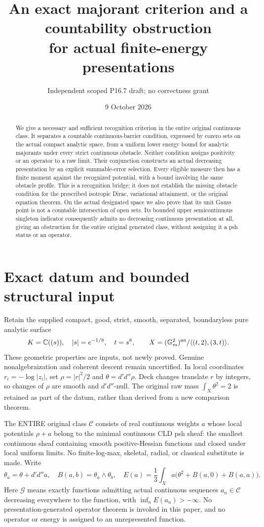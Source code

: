 \documentclass[11pt]{article}
\title{An exact majorant criterion and a countability obstruction\\
for actual finite-energy presentations}
\author{Independent scoped P16.7 draft; no correctness grant}
\date{9 October 2026}
\newcommand{\DD}{d'd''}
\newcommand{\C}{\mathcal C}
\newcommand{\G}{\mathcal G}
\begin{document}
\maketitle
\begin{abstract}
We give a necessary and sufficient recognition criterion in the entire
original continuous class. It separates a countable continuous-barrier
condition, expressed by cozero sets on the actual compact analytic space,
from a uniform lower energy bound for analytic majorants under every
strict continuous obstacle. Neither condition assigns positivity or an
operator to a raw limit. Their conjunction constructs an actual decreasing
presentation by an explicit summable-error selection. Every eligible
measure then has a finite moment against the recognized potential, with a
bound involving the same obstacle profile. This is a recognition bridge;
it does not establish the missing obstacle condition for the prescribed
isotropic Dirac, variational attainment, or the original equation theorem.
On the actual designated space we also prove that its unit Gauss point
is not a countable intersection of open sets. Its bounded upper
semicontinuous singleton indicator consequently admits no decreasing
continuous presentation at all, giving an obstruction for the entire
original generated class, without assigning it a psh status or an operator.
\end{abstract}

\section*{Exact datum and bounded structural input}
Retain the supplied compact, good, strict, smooth, separated, boundaryless
pure analytic surface
\[
 K=\mathbb C((s)),\quad |s|=e^{-1/8},\quad t=s^8,\qquad
 X=(\mathbb G_m^2)^{\rm an}/\langle(t,2),(3,t)\rangle.
\]
These geometric properties are inputs, not newly proved. Genuine
nonalgebraization and coherent descent remain uncertified. In local
coordinates $r_i=-\log|z_i|$, set $\rho=|r|^2/2$ and $\theta=\DD\rho$.
Deck changes translate $r$ by integers, so changes of $\rho$ are smooth
and $\DD$-null. The original raw mass $\int_X\theta^2=2$ is retained
as part of the datum, rather than derived from a new comparison theorem.

The ENTIRE original class $\C$ consists of real continuous weights $a$
whose local potentials $\rho+a$ belong to the minimal continuous CLD psh
sheaf: the smallest continuous sheaf containing smooth positive-Hessian
functions and closed under local uniform limits. No finite-log-max,
skeletal, radial, or classical substitute is made. Write
\[
 \theta_a=\theta+\DD a,\quad B(a,b)=\theta_a\wedge\theta_b,\quad
 E(a)=\frac13\int_X a\bigl(\theta^2+B(a,0)+B(a,a)\bigr).
\]
Here $\G$ means exactly functions admitting actual continuous sequences
$a_n\in\C$ decreasing everywhere to the function, with
$\inf_n E(a_n)>-\infty$. No presentation-generated operator theorem is
invoked in this paper, and no operator or energy is assigned to an
unrepresented function.
\end{document}
